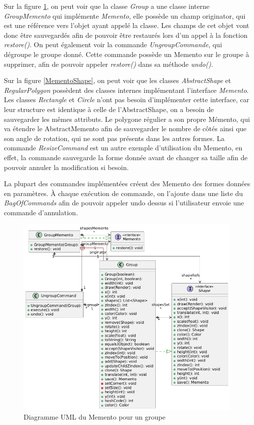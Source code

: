 \documentclass{article}
\begin{document}
Sur la figure \ref{MementoGroupe}, on peut voir que la classe \textit{Group} a une classe interne \textit{GroupMemento} qui implémente \textit{Memento}, 
elle possède un champ originator, qui est une référence vers l'objet ayant appelé la classe. Les champs de cet objet vont donc être sauvegardés afin de pouvoir
être restaurés lors d'un appel à la fonction \textit{restore()}. 
On peut également voir la commande \textit{UngroupCommande}, qui dégroupe le groupe donné. Cette commande possède un Memento sur le groupe à supprimer,
afin de pouvoir appeler \textit{restore()} dans sa méthode \textit{undo()}.

Sur la figure \ref{MementoShape}, on peut voir que les classes \textit{AbstractShape} et \textit{RegularPolygon} possèdent des classes internes implémentant
l'interface \textit{Memento}.  Les classes \textit{Rectangle} et \textit{Circle} n'ont pas besoin d'implémenter cette interface, car leur structure est identique à celle
de l'AbstractShape, on a besoin de sauvegarder les mêmes attributs. Le polygone régulier a son propre Mémento, qui va étendre le AbstractMemento 
afin de sauvegarder le nombre de côtés ainsi que son angle de rotation, qui ne sont pas présents dans les autres formes.
La commande \textit{ResizeCommand} est un autre exemple d'utilisation du Memento, en effet, la commande sauvegarde la forme donnée avant de
changer sa taille afin de pouvoir annuler la modification si besoin.

La plupart des commandes implémentées créent des Memento des formes données en paramètres. À chaque exécution de commande, on l'ajoute dans une liste du
\textit{BagOfCommands} afin de pouvoir appeler undo dessus si l'utilisateur envoie une commande d'annulation.
\begin{figure}[h]
    \centering
    \includegraphics[width=\textwidth,height=10.0cm,keepaspectratio]{memento.png}
    \caption{Diagramme UML du Memento pour un groupe}
    \label{MementoGroupe}
\end{figure}
\FloatBarrier
\end{document}
